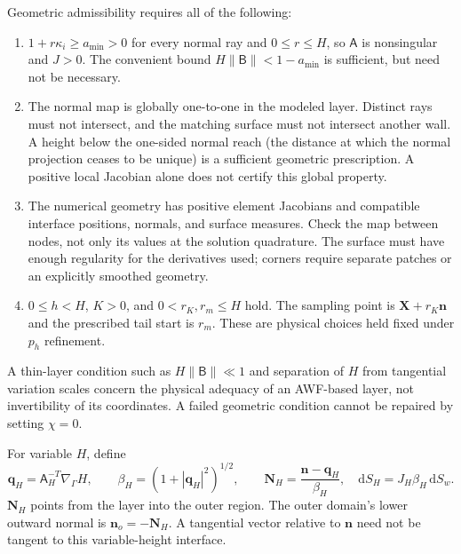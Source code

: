 \documentclass[11pt,a4paper]{article}
\numberwithin{equation}{section}
\newcommand{\dd}{\mathrm{d}}
\begin{document}
Geometric admissibility requires all of the following:
\begin{enumerate}
\item $1+r\kappa_i\geq a_{\min}>0$ for every normal ray and
$0\leq r\leq H$, so $\mathsf A$ is nonsingular and $J>0$. The convenient
bound $H\|\mathsf B\|<1-a_{\min}$ is sufficient, but need not be necessary.
\item The normal map is globally one-to-one in the modeled layer.
Distinct rays must not intersect, and the matching surface must not
intersect another wall. A height below the one-sided normal reach
(the distance at which the normal projection ceases to be unique)
is a sufficient geometric prescription. A positive local Jacobian
alone does not certify this global property.
\item The numerical geometry has positive element Jacobians and
compatible interface positions, normals, and surface measures. Check
the map between nodes, not only its values at the solution quadrature.
The surface must have enough regularity for the derivatives used;
corners require separate patches or an explicitly smoothed geometry.
\item $0\leq h<H$, $K>0$, and $0<r_K,r_m\leq H$ hold. The
sampling point is $\bm X+r_K\bm n$ and the prescribed tail start is
$r_m$. These are physical choices held fixed under $p_h$ refinement.
\end{enumerate}
A thin-layer condition such as $H\|\mathsf B\|\ll1$ and separation of $H$
from tangential variation scales concern the physical adequacy of an
AWF-based layer, not invertibility of its coordinates. A failed
geometric condition cannot be repaired by setting $\chi=0$.

For variable $H$, define
\begin{equation}
 \bm q_H=\mathsf A_H^{-T}\nabla_\Gamma H,\qquad
 \beta_H=(1+|\bm q_H|^2)^{1/2},\qquad
 \boxed{\bm N_H=\frac{\bm n-\bm q_H}{\beta_H},\quad
 \dd S_H=J_H\beta_H\,\dd S_w.}
 \label{eq:curve-interface-geometry}
\end{equation}
$\bm N_H$ points from the layer into the outer region. The outer
domain's lower outward normal is $\bm n_o=-\bm N_H$. A tangential
vector relative to $\bm n$ need not be tangent to this variable-height
interface.
\end{document}
